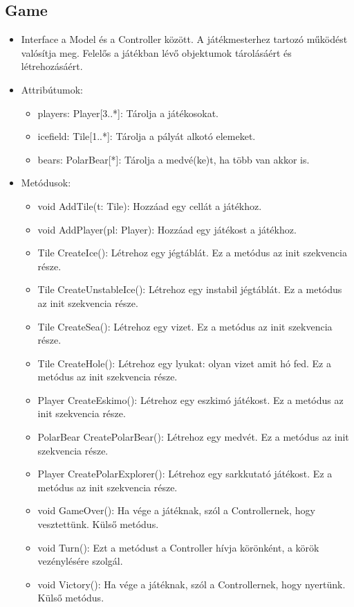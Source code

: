 \subsection{Game}
\begin{itemize}
	\item Interface a Model és a Controller között. A játékmesterhez tartozó működést valósítja meg. Felelős a játékban lévő objektumok tárolásáért és létrehozásáért.
	\item Attribútumok:
	\begin{itemize}
		\item players: Player[3..*]: Tárolja a játékosokat.
		\item icefield: Tile[1..*]: Tárolja a pályát alkotó elemeket.
		\item bears: PolarBear[*]: Tárolja a medvé(ke)t, ha több van akkor is.
	\end{itemize}
	\item Metódusok:
	\begin{itemize}
		\item void AddTile(t: Tile): Hozzáad egy cellát a játékhoz.
		\item void AddPlayer(pl: Player): Hozzáad egy játékost a játékhoz.
		\item Tile CreateIce(): Létrehoz egy jégtáblát. Ez a metódus az init szekvencia része.
		\item Tile CreateUnstableIce(): Létrehoz egy instabil jégtáblát. Ez a metódus az init szekvencia része.
		\item Tile CreateSea(): Létrehoz egy vizet. Ez a metódus az init szekvencia része.
		\item Tile CreateHole(): Létrehoz egy lyukat: olyan vizet amit hó fed. Ez a metódus az init szekvencia része.
		\item Player CreateEskimo(): Létrehoz egy eszkimó játékost. Ez a metódus az init szekvencia része.
		\item PolarBear CreatePolarBear(): Létrehoz egy medvét. Ez a metódus az init szekvencia része.
		\item Player CreatePolarExplorer(): Létrehoz egy sarkkutató játékost. Ez a metódus az init szekvencia része.
		\item void GameOver(): Ha vége a játéknak, szól a Controllernek, hogy vesztettünk. Külső metódus.
		\item void Turn(): Ezt a metódust a Controller hívja körönként, a körök vezénylésére szolgál. 
		\item void Victory(): Ha vége a játéknak, szól a Controllernek, hogy nyertünk. Külső metódus.
	\end{itemize}
\end{itemize}

